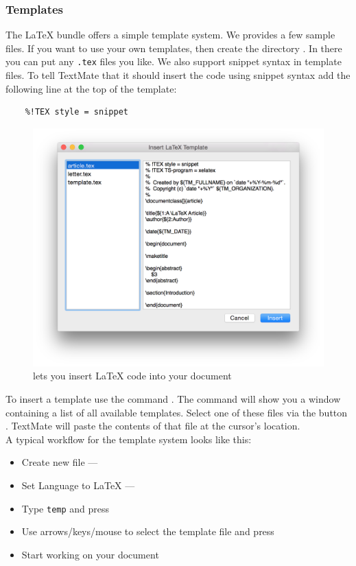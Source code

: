 \documentclass[11pt, x11names]{article}
\begin{document}
\subsubsection{Templates}

The LaTeX bundle offers a simple template system. We provides a few sample files. If you want to use your own templates, then create the directory . In there you can put any \texttt{.tex} files you like. We also support snippet syntax in template files. To tell TextMate that it should insert the code using snippet syntax add the following line at the top of the template:

\begin{verbatim}
    %!TEX style = snippet
\end{verbatim}

\begin{figure}[h]
  \centering
    \includegraphics[width=.8\textwidth]{Figures/Template Chooser.png}
  \caption{ lets you insert LaTeX code into your document}
  \label{fig:Figures_Template_Chooser}
\end{figure}

To insert a template use the command . The command will show you a window containing a list of all available templates. Select one of these files via the button . TextMate will paste the contents of that file at the cursor's location.\\

A typical workflow for the template system looks like this:

\begin{itemize}
    \item Create new file — 
    \item Set Language to LaTeX — 
    \item Type \texttt{temp} and press \keys{\tab}
    \item Use arrows/keys/mouse to select the template file and press \keys{\return}
    \item Start working on your document
\end{itemize}
\end{document}

